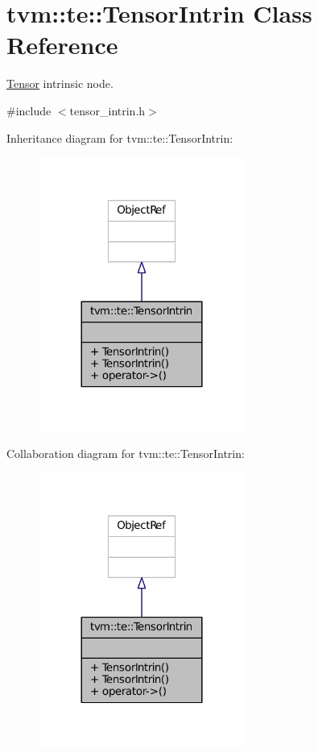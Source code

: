 \hypertarget{classtvm_1_1te_1_1TensorIntrin}{}\section{tvm\+:\+:te\+:\+:Tensor\+Intrin Class Reference}
\label{classtvm_1_1te_1_1TensorIntrin}


\hyperlink{classtvm_1_1te_1_1Tensor}{Tensor} intrinsic node.  




{\ttfamily \#include $<$tensor\+\_\+intrin.\+h$>$}



Inheritance diagram for tvm\+:\+:te\+:\+:Tensor\+Intrin\+:
\nopagebreak
\begin{figure}[H]
\begin{center}
\leavevmode
\includegraphics[width=192pt]{classtvm_1_1te_1_1TensorIntrin__inherit__graph}
\end{center}
\end{figure}


Collaboration diagram for tvm\+:\+:te\+:\+:Tensor\+Intrin\+:
\nopagebreak
\begin{figure}[H]
\begin{center}
\leavevmode
\includegraphics[width=192pt]{classtvm_1_1te_1_1TensorIntrin__coll__graph}
\end{center}
\end{figure}
